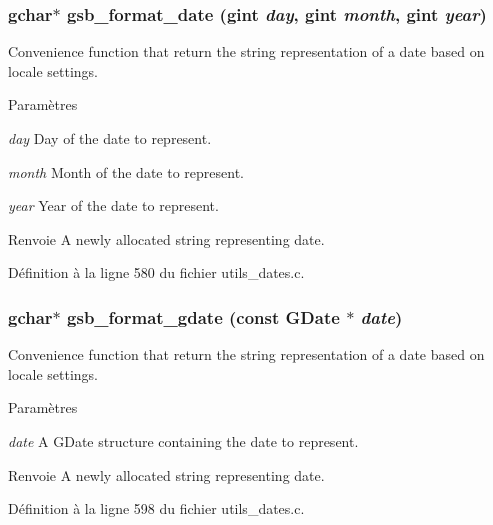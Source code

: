 \subsubsection[{gsb\_\-format\_\-date}]{\setlength{\rightskip}{0pt plus 5cm}gchar$\ast$ gsb\_\-format\_\-date (gint {\em day}, \/  gint {\em month}, \/  gint {\em year})}\label{utils__dates_8h_a6d8984b6159dab5d8f05b8da5b7509ed}
Convenience function that return the string representation of a date based on locale settings.


\begin{DoxyParams}{Paramètres}
\item[{\em day}]Day of the date to represent. \item[{\em month}]Month of the date to represent. \item[{\em year}]Year of the date to represent.\end{DoxyParams}
\begin{DoxyReturn}{Renvoie}
A newly allocated string representing date. 
\end{DoxyReturn}


Définition à la ligne 580 du fichier utils\_\-dates.c.

\subsubsection[{gsb\_\-format\_\-gdate}]{\setlength{\rightskip}{0pt plus 5cm}gchar$\ast$ gsb\_\-format\_\-gdate (const GDate $\ast$ {\em date})}\label{utils__dates_8h_a6e7537390d7569da5efc74f96ea57da7}
Convenience function that return the string representation of a date based on locale settings.


\begin{DoxyParams}{Paramètres}
\item[{\em date}]A GDate structure containing the date to represent.\end{DoxyParams}
\begin{DoxyReturn}{Renvoie}
A newly allocated string representing date. 
\end{DoxyReturn}


Définition à la ligne 598 du fichier utils\_\-dates.c.


